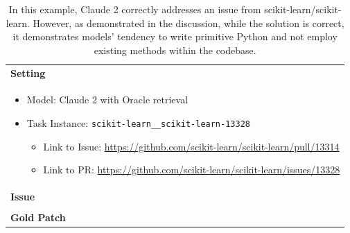 \begin{table}[ht]
\caption{
In this example, Claude 2 correctly addresses an issue from scikit-learn/scikit-learn. However, as demonstrated in the discussion, while the solution is correct, it demonstrates models' tendency to write primitive Python and not employ existing methods within the codebase.
}
\label{table:appx:quality-example6}
\centering
\begin{tabular}{p{\linewidth}}
    \toprule
    \textbf{Setting} \\
    \begin{itemize}[noitemsep,topsep=0pt]
        \item Model: Claude 2 with Oracle retrieval
        \item Task Instance: \texttt{scikit-learn\_\_scikit-learn-13328}
        \begin{itemize}
            \item Link to Issue: \href{https://github.com/scikit-learn/scikit-learn/pull/13314}{https://github.com/scikit-learn/scikit-learn/pull/13314}
            \item Link to PR: \href{https://github.com/scikit-learn/scikit-learn/issues/13328}{https://github.com/scikit-learn/scikit-learn/issues/13328}
        \end{itemize}
    \end{itemize} \\
    \midrule
    \textbf{Issue} \\
     \\
    \midrule
    \textbf{Gold Patch}
     \\
    \bottomrule
\end{tabular}
\end{table}
